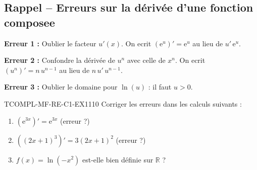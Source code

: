 

\subsection*{Rappel -- Erreurs sur la dérivée d'une fonction composee}

\textbf{Erreur 1 :} Oublier le facteur $u'(x)$. On ecrit $(\mathrm{e}^{u})' = \mathrm{e}^u$ au lieu de $u'\,\mathrm{e}^u$.

\textbf{Erreur 2 :} Confondre la dérivée de $u^n$ avec celle de $x^n$. On ecrit $(u^n)' = n\,u^{n-1}$ au lieu de $n\,u'\,u^{n-1}$.

\textbf{Erreur 3 :} Oublier le domaine pour $\ln(u)$ : il faut $u > 0$.

\begin{exercice}{TCOMPL-MF-RE-C1-EX1}{1}{10}
Corriger les erreurs dans les calculs suivants :
\begin{enumerate}
  \item $\left(\mathrm{e}^{3x}\right)' = \mathrm{e}^{3x}$ \quad (erreur ?)
  \item $\left((2x+1)^3\right)' = 3(2x+1)^2$ \quad (erreur ?)
  \item $f(x) = \ln(-x^2)$ est-elle bien définie sur $\mathbb{R}$ ?
\end{enumerate}
\end{exercice}

